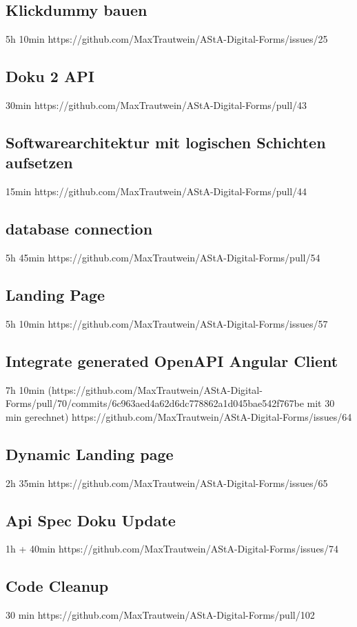 \subsection{Klickdummy bauen}
5h 10min
https://github.com/MaxTrautwein/AStA-Digital-Forms/issues/25

\subsection{Doku 2 API}
30min
https://github.com/MaxTrautwein/AStA-Digital-Forms/pull/43

\subsection{Softwarearchitektur mit logischen Schichten aufsetzen }
15min
https://github.com/MaxTrautwein/AStA-Digital-Forms/pull/44
\subsection{database connection}
5h 45min
https://github.com/MaxTrautwein/AStA-Digital-Forms/pull/54
\subsection{Landing Page}
5h 10min
https://github.com/MaxTrautwein/AStA-Digital-Forms/issues/57
\subsection{Integrate generated OpenAPI Angular Client}
7h 10min
(https://github.com/MaxTrautwein/AStA-Digital-Forms/pull/70/commits/6c963aed4a62d6dc778862a1d045bae542f767be mit 30 min gerechnet)
https://github.com/MaxTrautwein/AStA-Digital-Forms/issues/64
\subsection{Dynamic Landing page}
2h 35min
https://github.com/MaxTrautwein/AStA-Digital-Forms/issues/65
\subsection{Api Spec Doku Update}
1h + 40min
https://github.com/MaxTrautwein/AStA-Digital-Forms/issues/74
\subsection{Code Cleanup}
30 min
https://github.com/MaxTrautwein/AStA-Digital-Forms/pull/102
